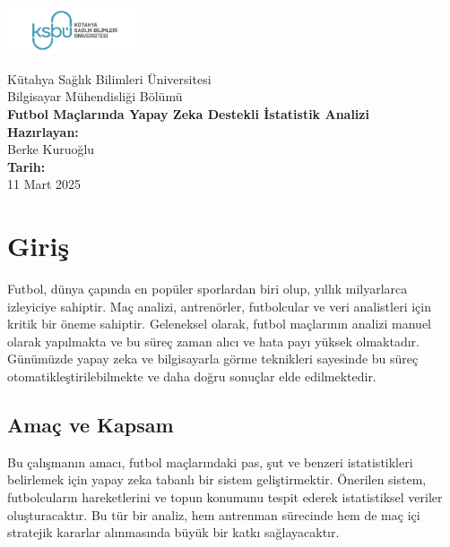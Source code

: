 \documentclass[a4paper,12pt]{article}
\begin{document}
	
	\begin{center}
		\vspace*{2cm}
		\includegraphics[width=4cm]{logo1.png} 
		\vspace{1cm}
		
		{\LARGE Kütahya Sağlık Bilimleri Üniversitesi}\\[1cm]
		{\Large Bilgisayar Mühendisliği Bölümü}\\[2cm]
		
		{\Huge \textbf{Futbol Maçlarında Yapay Zeka Destekli İstatistik Analizi}}\\[2cm]
		
		\textbf{Hazırlayan:}\\
		Berke Kuruoğlu\\[1cm]
		\textbf{Tarih:} \\ 11 Mart 2025\\[3cm]
	\end{center}
    
	\newpage
	
	\section{Giriş}
	
	Futbol, dünya çapında en popüler sporlardan biri olup, yıllık milyarlarca izleyiciye sahiptir. Maç analizi, antrenörler, futbolcular ve veri analistleri için kritik bir öneme sahiptir. Geleneksel olarak, futbol maçlarının analizi manuel olarak yapılmakta ve bu süreç zaman alıcı ve hata payı yüksek olmaktadır. Günümüzde yapay zeka ve bilgisayarla görme teknikleri sayesinde bu süreç otomatikleştirilebilmekte ve daha doğru sonuçlar elde edilmektedir. \cite{chatgpt2025}
	
	\subsection{Amaç ve Kapsam}
	
	Bu çalışmanın amacı, futbol maçlarındaki pas, şut ve benzeri istatistikleri belirlemek için yapay zeka tabanlı bir sistem geliştirmektir. Önerilen sistem, futbolcuların hareketlerini ve topun konumunu tespit ederek istatistiksel veriler oluşturacaktır. Bu tür bir analiz, hem antrenman sürecinde hem de maç içi stratejik kararlar alınmasında büyük bir katkı sağlayacaktır. 
	
\end{document}
